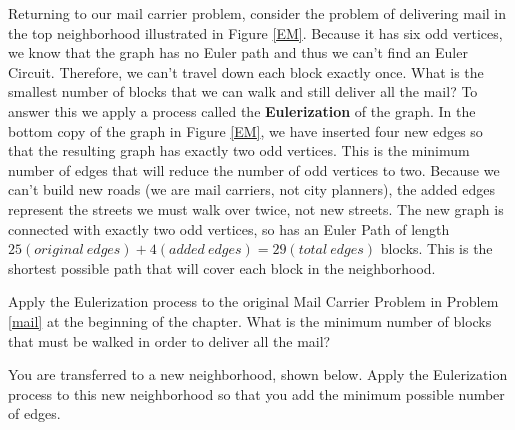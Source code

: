 Returning to our mail carrier problem, consider the problem of delivering mail in the top neighborhood illustrated in Figure \ref{EM}.  Because it has six odd vertices, we know that the graph has no Euler path and thus we can't find an Euler Circuit.  Therefore, we can't travel down each block exactly once. What is the smallest number of blocks that we can walk and still deliver all the mail? To answer this we apply a process called the \textbf{Eulerization} of the graph.  In the bottom copy of the graph in Figure \ref{EM}, we have inserted four new edges so that the resulting graph has exactly two odd vertices.  This is the minimum number of edges that will reduce the number of odd vertices to two. Because we can't build new roads (we are mail carriers, not city planners), the added edges represent the streets we must walk over twice, not new streets. The new graph is connected with exactly two odd vertices, so has an Euler Path of length $25 (original \ edges) + 4 (added \ edges) = 29 (total \ edges)$ blocks.  This is the shortest possible path that will cover each block in the neighborhood.

\begin{prb}
Apply the Eulerization process to the original Mail Carrier Problem in Problem \ref{mail} at the beginning of the chapter.
What is the minimum number of blocks that must be walked in order to deliver all the mail?
\begin{annotation}
\end{annotation}
\end{prb}


\begin{prb}
You are transferred to a new neighborhood, shown below.  Apply the Eulerization process to this new neighborhood so that you add the minimum possible number of edges.
\end{prb}

